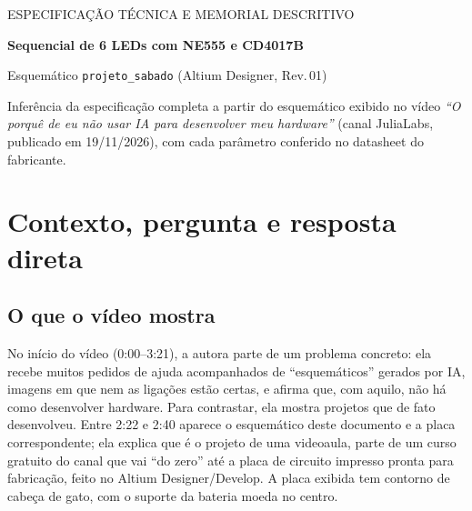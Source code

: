 \documentclass[11pt,a4paper]{article}
\begin{document}
\begin{tcolorbox}[enhanced, colback=petroleo, colframe=petroleo, arc=2mm,
  left=6mm, right=6mm, top=5mm, bottom=5mm]
\color{white}\sffamily
{\small ESPECIFICAÇÃO TÉCNICA E MEMORIAL DESCRITIVO}\par\vspace{2mm}
{\LARGE\bfseries Sequencial de 6 LEDs com NE555 e CD4017B}\par\vspace{1mm}
{\large Esquemático \texttt{projeto\_sabado} (Altium Designer, Rev.\,01)}\par\vspace{3mm}
{\small Inferência da especificação completa a partir do esquemático exibido no vídeo
\emph{“O porquê de eu não usar IA para desenvolver meu hardware”} (canal JuliaLabs,
publicado em 19/11/2026), com cada parâmetro conferido no datasheet do fabricante.}
\end{tcolorbox}


\tableofcontents

\section{Contexto, pergunta e resposta direta}

\subsection{O que o vídeo mostra}

No início do vídeo (0:00–3:21), a autora parte de um problema concreto: ela recebe
muitos pedidos de ajuda acompanhados de “esquemáticos” gerados por IA, imagens em que
nem as ligações estão certas, e afirma que, com aquilo, não há como desenvolver
hardware. Para contrastar, ela mostra projetos que de fato desenvolveu. Entre 2:22 e
2:40 aparece o esquemático deste documento e a placa correspondente; ela explica que é
o projeto de uma videoaula, parte de um curso gratuito do canal que vai “do zero” até a
placa de circuito impresso pronta para fabricação, feito no Altium Designer/Develop.
A placa exibida tem contorno de cabeça de gato, com o suporte da bateria moeda no centro.
\end{document}

